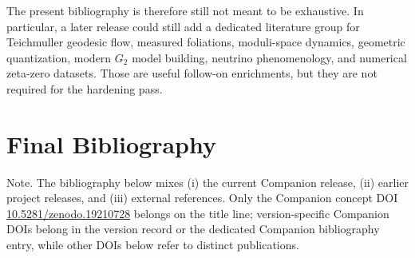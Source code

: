 \documentclass[12pt,a4paper]{article}
\begin{document}
\noindent The present bibliography is therefore still not meant to be exhaustive. In particular, a later release could still add a dedicated literature group for Teichmuller geodesic flow, measured foliations, moduli-space dynamics, geometric quantization, modern $G_2$ model building, neutrino phenomenology, and numerical zeta-zero datasets. Those are useful follow-on enrichments, but they are not required for the hardening pass.

\clearpage
\section*{Final Bibliography}

\noindent Note. The bibliography below mixes (i) the current Companion release, (ii) earlier project releases, and (iii) external references. Only the Companion concept DOI \href{https://doi.org/10.5281/zenodo.19210728}{10.5281/zenodo.19210728} belongs on the title line; version-specific Companion DOIs belong in the version record or the dedicated Companion bibliography entry, while other DOIs below refer to distinct publications.
\end{document}
